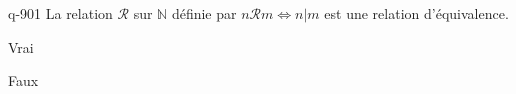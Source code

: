 \begin{truefalse}{q-901}
La relation $\mathcal R$ sur $\mathbb N$ définie par $n\mathcal R m \iff n|m$ est une relation d'équivalence.
\item Vrai
\item* Faux
\end{truefalse}

